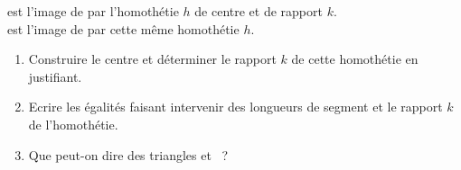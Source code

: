 \documentclass[exercice]{thedocument}%
\begin{document}
%
 est l'image de  par l'homothétie $h$ de centre  et de rapport $k$.\\[0.2em]
 est l'image de  par cette même homothétie $h$.

\begin{enumerate}
  \item Construire le centre  et déterminer le rapport $k$ de cette homothétie en justifiant.
  \item Ecrire les égalités faisant intervenir des longueurs de segment et le rapport $k$ de l'homothétie.
  \item Que peut-on dire des triangles  et ~?
\end{enumerate}

\begin{center}
\end{center}
\end{document}
